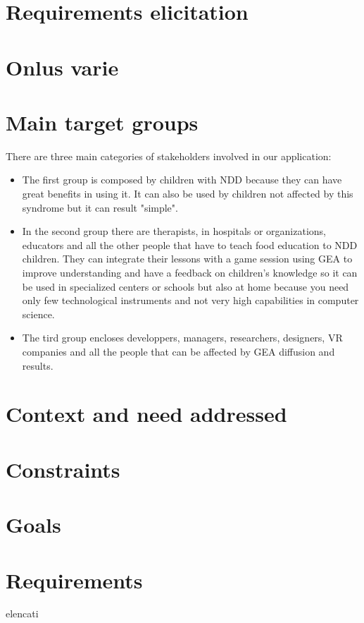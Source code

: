 \section{Requirements elicitation}
\section{Onlus varie}
\section{Main target groups}
There are three main categories of stakeholders involved in our application:
\begin{itemize}
\item The first group is composed by children with NDD because they can have great benefits in using it. It can also be used by children not affected by this syndrome but it can result "simple".
\item In the second group there are therapists, in hospitals or organizations, educators and all the other people that have to teach food education to NDD children. They can integrate their lessons with a game session using GEA to improve understanding and have a feedback on children's knowledge so it can be used in specialized centers or schools but also at home because you need only few technological instruments and not very high capabilities in computer science.
\item The tird group encloses developpers, managers, researchers, designers, VR companies and all the people that can be affected by GEA diffusion and results.
\end{itemize} 
\section{Context and need addressed}
\section{Constraints}
\section{Goals}
\section{Requirements}
elencati